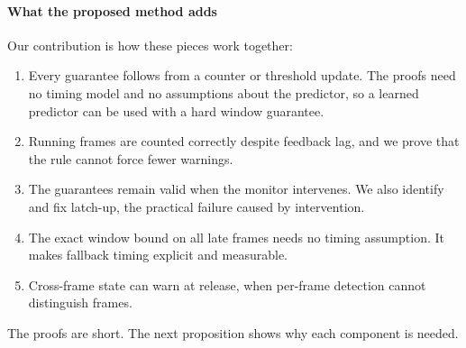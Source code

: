 \documentclass[acmsmall,screen]{acmart}
\begin{document}
\paragraph{What the proposed method adds} Our contribution is how these pieces work together:
\begin{enumerate}
\item Every guarantee follows from a counter or threshold update. The proofs need no timing model and no assumptions about the predictor, so a learned predictor can be used with a hard window guarantee.
\item Running frames are counted correctly despite feedback lag, and we prove that the rule cannot force fewer warnings.
\item The guarantees remain valid when the monitor intervenes. We also identify and fix latch-up, the practical failure caused by intervention.
\item The exact window bound on all late frames needs no timing assumption. It makes fallback timing explicit and measurable.
\item Cross-frame state can warn at release, when per-frame detection cannot distinguish frames.
\end{enumerate}
The proofs are short. The next proposition shows why each component is needed.
\end{document}
